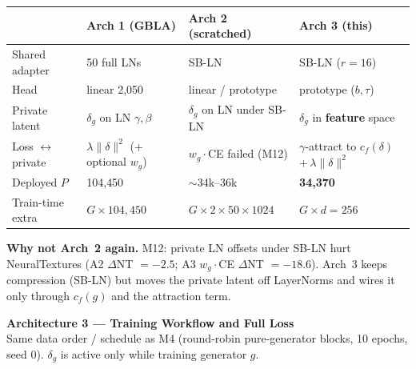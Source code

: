 \documentclass[11pt]{article}
\begin{document}
\vspace{4mm}
\begin{center}
\small
\begin{tabular}{L{48mm}L{55mm}L{55mm}L{55mm}}
\toprule
 & \textbf{Arch 1 (GBLA)} & \textbf{Arch 2 (scratched)} & \textbf{Arch 3 (this)} \\
\midrule
Shared adapter & 50 full LNs & SB-LN & SB-LN (\(r{=}16\)) \\
Head & linear 2{,}050 & linear / prototype & prototype (\(b,\tau\)) \\
Private latent & \(\delta_g\) on LN \(\gamma,\beta\) & \(\delta_g\) on LN under SB-LN & \(\delta_g\) in \textbf{feature} space \\
Loss \(\leftrightarrow\) private & \(\lambda\|\delta\|^2\) (+ optional \(w_g\)) & \(w_g{\cdot}\)CE failed (M12) & \(\gamma\)-attract to \(c_f(\delta)\) \(+\,\lambda\|\delta\|^2\) \\
Deployed \(P\) & 104{,}450 & \(\sim\)34k--36k & \textbf{34{,}370} \\
Train-time extra & \(G{\times}104{,}450\) & \(G{\times}2{\times}50{\times}1024\) & \(G{\times}d=256\) \\
\bottomrule
\end{tabular}
\end{center}

\vfill
{\small\textbf{Why not Arch~2 again.} M12: private LN offsets under SB-LN hurt NeuralTextures (A2 \(\Delta\)NT \(=-2.5\); A3 \(w_g{\cdot}\)CE \(\Delta\)NT \(=-18.6\)). Arch~3 keeps compression (SB-LN) but moves the private latent off LayerNorms and wires it only through \(c_f(g)\) and the attraction term.}

\newpage
\begin{center}
{\Large\bfseries Architecture 3 --- Training Workflow and Full Loss}\\[2pt]
{\small Same data order / schedule as M4 (round-robin pure-generator blocks, 10 epochs, seed 0). \(\delta_g\) is active only while training generator \(g\).}
\end{center}
\vspace{4mm}
\end{document}
